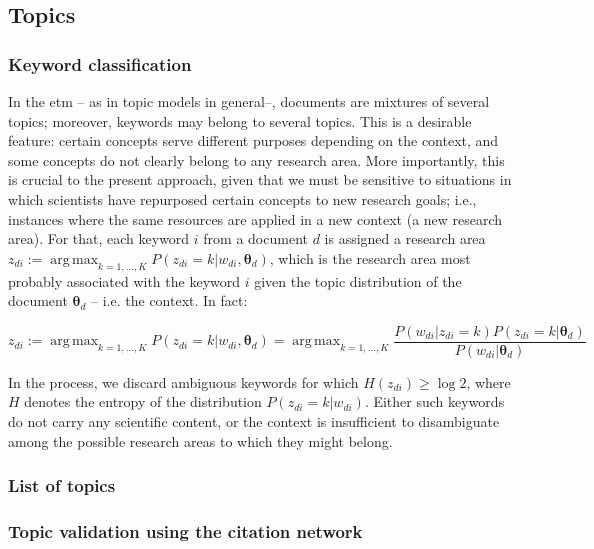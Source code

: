 \documentclass{article}
\DeclareMathOperator*{\argmax}{arg\,max}
\begin{document}
\subsection{\label{appendix:topics}Topics}

\subsubsection{\label{appendix:keywords}Keyword classification}

In the \gls{etm} -- as in topic models in general--, documents are mixtures of several topics; moreover, keywords may belong to several topics. This is a desirable feature: certain concepts serve different purposes depending on the context, and some concepts do not clearly belong to any research area. More importantly, this is crucial to the present approach, given that we must be sensitive to situations in which scientists have repurposed certain concepts to new research goals; i.e., instances where the same resources are applied in a new context (a new research area).
For that, each keyword $i$ from a document $d$ is assigned a research area $z_{di} := \argmax_{k=1,\dots,K} P(z_{di}=k|w_{di},\bm{\theta}_{d})$, which is the research area most probably associated with the keyword $i$ given the topic distribution of the document $\bm{\theta}_d$ -- i.e. the context. In fact:

\begin{equation}
    z_{di} := \argmax_{k=1,\dots,K} P(z_{di}=k|w_{di},\bm{\theta}_{d}) =  \argmax_{k=1,\dots,K} \dfrac{P(w_{di}|z_{di}=k)P(z_{di}=k|\bm{\theta}_d)}{P(w_{di}|\bm{\theta}_d)}
\end{equation}

In the process, we discard ambiguous keywords for which $H(z_{di})\geq \log{2}$, where $H$ denotes the entropy of the distribution $P(z_{di}=k|w_{di})$. Either such keywords do not carry any scientific content, or the context is insufficient to disambiguate among the possible research areas to which they might belong.

\subsubsection{List of topics}

\fontsize{6}{7}\selectfont\normalsize

\subsubsection{\label{appendix:citation_validation}Topic validation using the citation network}
\end{document}
